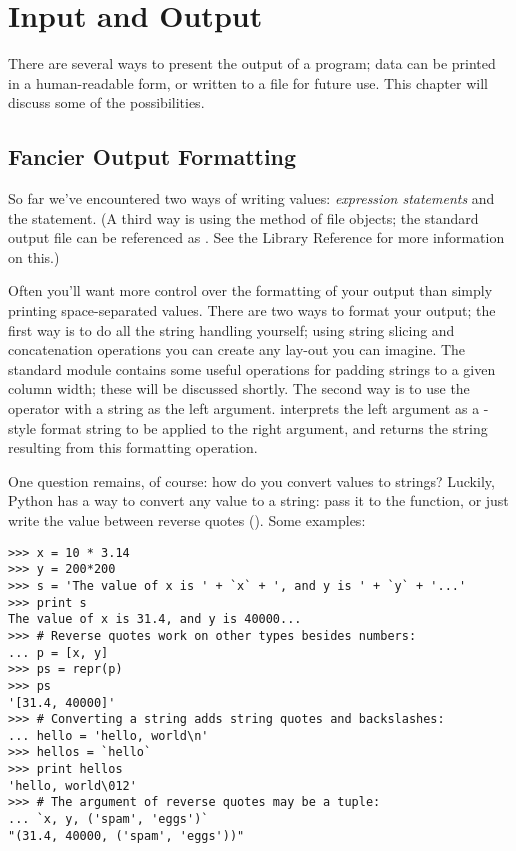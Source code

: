\documentclass{manual}
\begin{document}
\chapter{Input and Output}
\label{io}

There are several ways to present the output of a program; data can be
printed in a human-readable form, or written to a file for future use.
This chapter will discuss some of the possibilities.

\section{Fancier Output Formatting}
So far we've encountered two ways of writing values: \emph{expression
statements} and the  statement.  (A third way is using
the  method of file objects; the standard output file
can be referenced as .  See the Library Reference for
more information on this.)

Often you'll want more control over the formatting of your output than
simply printing space-separated values.  There are two ways to format
your output; the first way is to do all the string handling yourself;
using string slicing and concatenation operations you can create any
lay-out you can imagine.  The standard module
 contains some useful operations
for padding strings to a given column width;
these will be discussed shortly.  The second way is to use the
\code{\%} operator with a string as the left argument.  \code{\%}
interprets the left argument as a \C{} -style
format string to be applied to the right argument, and returns the
string resulting from this formatting operation.

One question remains, of course: how do you convert values to strings?
Luckily, Python has a way to convert any value to a string: pass it to
the  function, or just write the value between
reverse quotes ().  Some examples:

\begin{verbatim}
>>> x = 10 * 3.14
>>> y = 200*200
>>> s = 'The value of x is ' + `x` + ', and y is ' + `y` + '...'
>>> print s
The value of x is 31.4, and y is 40000...
>>> # Reverse quotes work on other types besides numbers:
... p = [x, y]
>>> ps = repr(p)
>>> ps
'[31.4, 40000]'
>>> # Converting a string adds string quotes and backslashes:
... hello = 'hello, world\n'
>>> hellos = `hello`
>>> print hellos
'hello, world\012'
>>> # The argument of reverse quotes may be a tuple:
... `x, y, ('spam', 'eggs')`
"(31.4, 40000, ('spam', 'eggs'))"
\end{verbatim}
\end{document}
